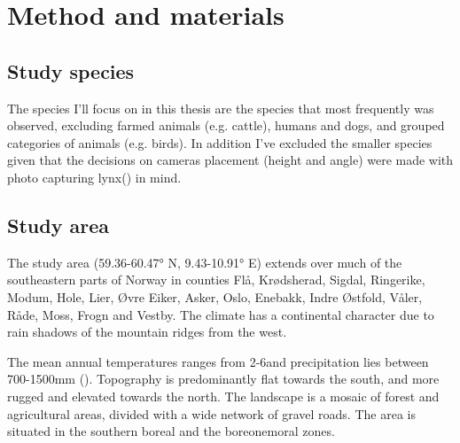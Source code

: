 \chapter{Method and materials}


\section{Study species} %


The species I'll focus on in this thesis are the species that most frequently was observed, excluding farmed animals (e.g. cattle), humans and dogs, and grouped categories of animals (e.g. birds).
In addition I've excluded the smaller species given that the decisions on cameras placement (height and angle) were made with photo capturing lynx() in mind.

\section{Study area} %


The study area (59.36-60.47° N, 9.43-10.91° E) %
extends over much of the southeastern parts of Norway in counties Flå, Krødsherad, Sigdal, Ringerike, Modum, Hole, Lier, Øvre Eiker, Asker, Oslo, Enebakk, Indre Østfold, Våler, Råde, Moss, Frogn and Vestby.
The climate has a continental character due to rain shadows of the mountain ridges from the west. 

The mean annual temperatures ranges from 2-6\celsius  and precipitation lies between 700-1500mm (\cite{Moen1999}). 
Topography is predominantly flat towards the south, and more rugged and elevated towards the north. The landscape is a mosaic of forest and agricultural areas, divided with a wide network of gravel roads.
The area is situated in the southern boreal and the boreonemoral zones. %

